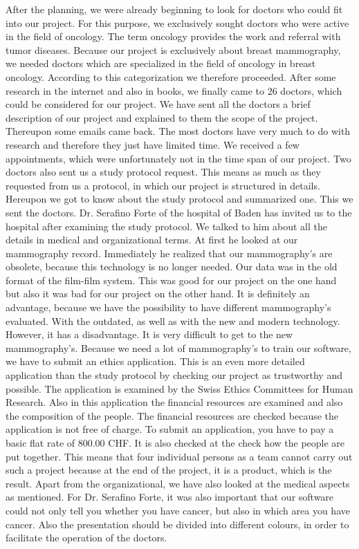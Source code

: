 After the planning, we were already beginning to look for doctors who could fit into our project. 
For this purpose, we exclusively sought doctors who were active in the field of oncology. 
The term oncology provides the work and referral with tumor diseases. 
Because our project is exclusively about breast mammography, we needed doctors which are specialized in the field of oncology in breast oncology.  
According to this categorization we therefore proceeded. 
After some research in the internet and also in books, we finally came to 26 doctors, which could be considered for our project. 
We have sent all the doctors a brief description of our project and explained to them the scope of the project.  Thereupon some emails came back. 
The most doctors have very much to do with research and therefore they just have limited time. 
We received a few appointments, which were unfortunately not in the time span of our project. 
Two doctors also sent us a study protocol request. 
This means as much as they requested from us a protocol, in which our project is structured in details. 
Hereupon we got to know about the study protocol and summarized one. 
This we sent the doctors. 
Dr. Serafino Forte of the hospital of Baden has invited us to the hospital after examining the study protocol. 
We talked to him about all the details in medical and organizational terms. At first he looked at our mammography record. Immediately he realized that our mammography’s are obsolete, because this technology is no longer needed. 
Our data was in the old format of the film-film system. This was good for our project on the one hand but also it was bad for our project on the other hand. 
It is definitely an advantage, because we have the possibility to have different mammography’s evaluated. 
With the outdated, as well as with the new and modern technology. 
However, it has a disadvantage. 
It is very difficult to get to the new mammography’s. Because we need a lot of mammography’s to train our software, we have to submit an ethics application. 
This is an even more detailed application than the study protocol by checking our project as trustworthy and possible. 
The application is examined by the Swiss Ethics Committees for Human Research. 
Also in this application the financial resources are examined and also the composition of the people. 
The financial resources are checked because the application is not free of charge. 
To submit an application, you have to pay a basic flat rate of 800.00 CHF. 
It is also checked at the check how the people are put together. 
This means that four individual persons as a team cannot carry out such a project because at the end of the project, it is a product, which is the result. 
Apart from the organizational, we have also looked at the medical aspects as mentioned. 
For Dr. Serafino Forte, it was also important that our software could not only tell you whether you have cancer, but also in which area you have cancer. 
Also the presentation should be divided into different colours, in order to facilitate the operation of the doctors. 

